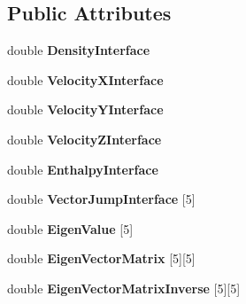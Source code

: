 \subsection*{Public Attributes}
\begin{DoxyCompactItemize}
\item 
double {\bfseries Density\+Interface}\hypertarget{classinterface_a5a0a592bdfe7f5987c2c4f4424fbccd9}{}\label{classinterface_a5a0a592bdfe7f5987c2c4f4424fbccd9}

\item 
double {\bfseries Velocity\+X\+Interface}\hypertarget{classinterface_afae6ebb7814474f2264759a14521f448}{}\label{classinterface_afae6ebb7814474f2264759a14521f448}

\item 
double {\bfseries Velocity\+Y\+Interface}\hypertarget{classinterface_a0f42e6e3fd259e9fc191a255a6650ef6}{}\label{classinterface_a0f42e6e3fd259e9fc191a255a6650ef6}

\item 
double {\bfseries Velocity\+Z\+Interface}\hypertarget{classinterface_a1f1cc4570519d23fc38414472d7721f9}{}\label{classinterface_a1f1cc4570519d23fc38414472d7721f9}

\item 
double {\bfseries Enthalpy\+Interface}\hypertarget{classinterface_af2f6d43336396abc20bd88521e489a71}{}\label{classinterface_af2f6d43336396abc20bd88521e489a71}

\item 
double {\bfseries Vector\+Jump\+Interface} \mbox{[}5\mbox{]}\hypertarget{classinterface_aa99760e0d73f30c6f1541414efc76f87}{}\label{classinterface_aa99760e0d73f30c6f1541414efc76f87}

\item 
double {\bfseries Eigen\+Value} \mbox{[}5\mbox{]}\hypertarget{classinterface_a6e63abc816f019315477dc514963c505}{}\label{classinterface_a6e63abc816f019315477dc514963c505}

\item 
double {\bfseries Eigen\+Vector\+Matrix} \mbox{[}5\mbox{]}\mbox{[}5\mbox{]}\hypertarget{classinterface_a5889dedb2a24917fa46bd4c6515a33c7}{}\label{classinterface_a5889dedb2a24917fa46bd4c6515a33c7}

\item 
double {\bfseries Eigen\+Vector\+Matrix\+Inverse} \mbox{[}5\mbox{]}\mbox{[}5\mbox{]}\hypertarget{classinterface_ae67dd839deeeacfb620b114c560ea0a5}{}\label{classinterface_ae67dd839deeeacfb620b114c560ea0a5}


\end{DoxyCompactItemize}

